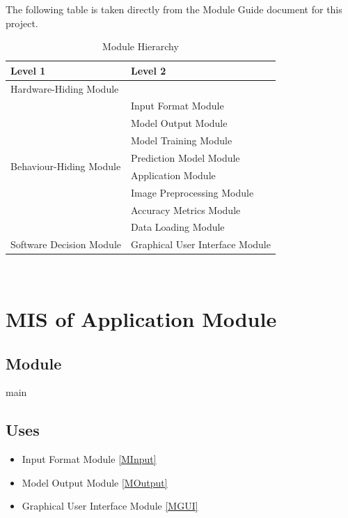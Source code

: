 \documentclass[12pt, titlepage]{article}
\begin{document}
The following table is taken directly from the Module Guide document for this project.

\begin{table}[h!]
\centering
\begin{tabular}{p{} p{}}
\toprule
\textbf{Level 1} & \textbf{Level 2}\\
\midrule

{Hardware-Hiding Module} & ~ \\
\midrule

\multirow{8}{0.3\textwidth}{Behaviour-Hiding Module} &
Input Format Module\\
& Model Output Module\\
& Model Training Module\\
& Prediction Model Module\\
& Application Module\\
& Image Preprocessing Module\\
& Accuracy Metrics Module\\
& Data Loading Module\\
\midrule

\multirow{1}{0.3\textwidth}{Software Decision Module}&
Graphical User Interface Module\\
\bottomrule

\end{tabular}
\caption{Module Hierarchy}
\label{TblMH}
\end{table}

\newpage
~\newpage

\section{MIS of Application Module} \label{MApplication}

\subsection{Module}

main

\subsection{Uses}

\begin{itemize}
  \item Input Format Module \ref{MInput}
  \item Model Output Module \ref{MOutput}
  \item Graphical User Interface Module \ref{MGUI}
\end{itemize}
\end{document}

